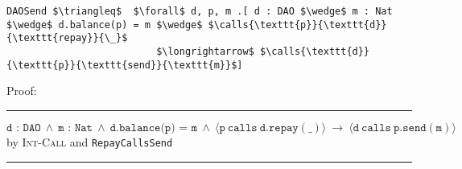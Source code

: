 \documentclass[12pt]{article}
\newcommand\calls[4]{\langle #1\ \texttt{calls}\ #2.#3(#4) \rangle}
\numberwithin{case}{lemma}
\numberwithin{case}{theorem}
\numberwithin{subcase}{case}
\begin{document}
\begin{lstlisting}[mathescape=true]
DAOSend $\triangleq$  $\forall$ d, p, m .[ d : DAO $\wedge$ m : Nat $\wedge$ d.balance(p) = m $\wedge$ $\calls{\texttt{p}}{\texttt{d}}{\texttt{repay}}{\_}$
                          $\longrightarrow$ $\calls{\texttt{d}}{\texttt{p}}{\texttt{send}}{\texttt{m}}$]
\end{lstlisting}
Proof:
\vspace{3mm}
\footnotesize
\hrule
\vspace{3mm}
$$
	\texttt{d : DAO}\ \wedge\ \texttt{m : Nat}\ \wedge\ \texttt{d.balance(p) = m}\ \wedge\ \calls{\texttt{p}}{\texttt{d}}{\texttt{repay}}{\_}\
                          \longrightarrow\ \calls{\texttt{d}}{\texttt{p}}{\texttt{send}}{\texttt{m}}
$$
\normalsize
\hfill by \textsc{Int-Call} and \texttt{RepayCallsSend}
\hrule
\vspace{3mm}
\end{document}
